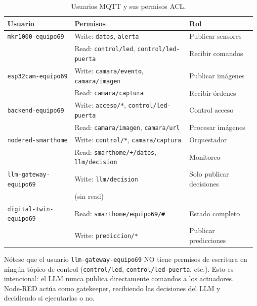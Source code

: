 \documentclass[12pt,letterpaper]{article}
\begin{document}
\begin{table}[H]
    \centering
    \caption{Usuarios MQTT y sus permisos ACL.}
    \label{tab:usuarios_mqtt}
    \small
    \begin{tabular}{p{4cm}p{6cm}l}
        \toprule
        \textbf{Usuario} & \textbf{Permisos} & \textbf{Rol} \\
        \midrule
        \mbox{\texttt{mkr1000-equipo69}} & Write: \mbox{\texttt{datos}}, \mbox{\texttt{alerta}} & Publicar sensores \\
        & Read: \mbox{\texttt{control/led}}, \mbox{\texttt{control/led-puerta}} & Recibir comandos \\
        \midrule
        \mbox{\texttt{esp32cam-equipo69}} & Write: \mbox{\texttt{camara/evento}}, \mbox{\texttt{camara/imagen}} & Publicar imágenes \\
        & Read: \mbox{\texttt{camara/captura}} & Recibir órdenes \\
        \midrule
        \mbox{\texttt{backend-equipo69}} & Write: \mbox{\texttt{acceso/*}}, \mbox{\texttt{control/led-puerta}} & Control acceso \\
        & Read: \mbox{\texttt{camara/imagen}}, \mbox{\texttt{camara/url}} & Procesar imágenes \\
        \midrule
        \mbox{\texttt{nodered-smarthome}} & Write: \mbox{\texttt{control/*}}, \mbox{\texttt{camara/captura}} & Orquestador \\
        & Read: \mbox{\texttt{smarthome/+/datos}}, \mbox{\texttt{llm/decision}} & Monitoreo \\
        \midrule
        \mbox{\texttt{llm-gateway-equipo69}} & Write: \mbox{\texttt{llm/decision}} & Solo publicar decisiones \\
        & (sin read) & \\
        \midrule
        \mbox{\texttt{digital-twin-equipo69}} & Read: \mbox{\texttt{smarthome/equipo69/\#}} & Estado completo \\
        & Write: \mbox{\texttt{prediccion/*}} & Publicar predicciones \\
        \bottomrule
    \end{tabular}
\end{table}

Nótese que el usuario \mbox{\texttt{llm-gateway-equipo69}} NO tiene permisos de escritura en ningún tópico de control (\mbox{\texttt{control/led}}, \mbox{\texttt{control/led-puerta}}, etc.). Esto es intencional: el LLM nunca publica directamente comandos a los actuadores. Node-RED actúa como gatekeeper, recibiendo las decisiones del LLM y decidiendo si ejecutarlas o no.
\end{document}
